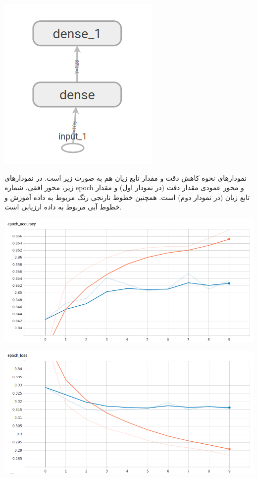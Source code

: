 \documentclass{article}
\begin{document}
\begin{center}
	\includegraphics[scale=0.45]{model_graph.png} 
\end{center}    

نمودارهای نحوه کاهش دقت و مقدار تابع زیان هم به صورت زیر است.
در نمودارهای زیر، محور افقی، شماره epoch و محور عمودی مقدار دقت (در نمودار اول) و مقدار تابع زیان (در نمودار دوم) است. همچنین خطوط نارنجی رنگ مربوط به داده آموزش و خطوط آبی مربوط به داده ارزیابی است.


\begin{center}
	\includegraphics[scale=0.45]{epoch_accuracy.png} 
\end{center}    

\begin{center}
	\includegraphics[scale=0.45]{epoch_loss.png} 
\end{center}    
\end{document}
